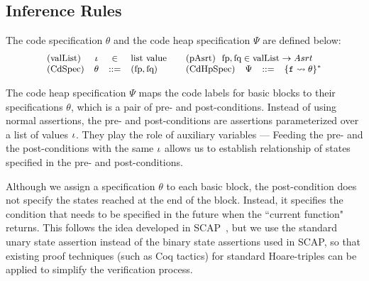 \subsection{Inference Rules}
\label{subsec:inference rules}
\newcommand{\tinybftext}[1]{\textbf{\scriptsize{#1}}}


The code specification $\theta$ and the code heap specification $\Psi$
are defined below:
\[
	\small
	\begin{array}{lccllccl}
		\text{(valList)} & \lgvl & \in & \text{list value}
			&
		\multicolumn{4}{l}
		{
			\quad
			\text{(pAsrt)} \ \
			\specpre,\specpost \in
			\text{valList} \rightarrow Asrt
		}
		\\
		
		\text{(CdSpec)} & \Bspec & ::= & (\specpre, \specpost)
			& \quad
		
		\text{(CdHpSpec)} & \Cspec & ::= & \{\lab{} \rightsquigarrow \Bspec\}^{*}
	\end{array}
\]

The code heap specification $\Psi$ maps the code labels
for basic blocks to their specifications $\theta$,
which is a pair of pre- and post-conditions.
Instead of using normal assertions, the pre- and
post-conditions are assertions parameterized over
a list of values $\iota$. They play the role
of auxiliary variables --- Feeding the pre-
and the post-conditions with the same $\iota$ allows
us to establish relationship of states specified
in the pre- and post-conditions.

Although we assign a specification $\theta$ to each basic block,
the post-condition does not specify the states reached at the end
of the block. Instead, it specifies the condition
that needs to be specified in the future when the
``current function" returns. This follows the idea
developed in SCAP~\cite{Feng06pldi}, but we use the
standard unary state assertion instead of the binary
state assertions used in SCAP, so that existing
proof techniques (such as Coq tactics) for standard
Hoare-triples can be applied to simplify the verification
process.


